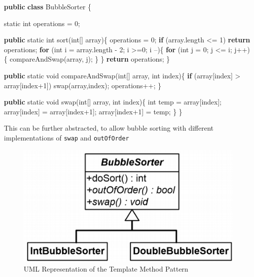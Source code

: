 \documentclass[]{article}
\newenvironment{Shaded}{}{}
\newcommand{\DataTypeTok}[1]{\textcolor[rgb]{0.56,0.13,0.00}{#1}}
\newcommand{\DecValTok}[1]{\textcolor[rgb]{0.25,0.63,0.44}{#1}}
\newcommand{\FunctionTok}[1]{\textcolor[rgb]{0.02,0.16,0.49}{#1}}
\newcommand{\KeywordTok}[1]{\textcolor[rgb]{0.00,0.44,0.13}{\textbf{#1}}}
\newcommand{\NormalTok}[1]{#1}
\begin{document}
\begin{Shaded}
\begin{Highlighting}[]
\KeywordTok{public} \KeywordTok{class}\NormalTok{ BubbleSorter \{}
    
    \DataTypeTok{static} \DataTypeTok{int}\NormalTok{ operations = }\DecValTok{0}\NormalTok{;}
    
    \KeywordTok{public} \DataTypeTok{static} \DataTypeTok{int} \FunctionTok{sort}\NormalTok{(}\DataTypeTok{int}\NormalTok{[] array)\{}
\NormalTok{        operations = }\DecValTok{0}\NormalTok{;}
        \KeywordTok{if}\NormalTok{ (array.}\FunctionTok{length}\NormalTok{ <= }\DecValTok{1}\NormalTok{)}
            \KeywordTok{return}\NormalTok{ operations;}
        \KeywordTok{for}\NormalTok{ (}\DataTypeTok{int}\NormalTok{ i = array.}\FunctionTok{length}\NormalTok{ - }\DecValTok{2}\NormalTok{; i >=}\DecValTok{0}\NormalTok{; i --)\{}
            \KeywordTok{for}\NormalTok{ (}\DataTypeTok{int}\NormalTok{ j = }\DecValTok{0}\NormalTok{; j <= i; j++)\{}
                \FunctionTok{compareAndSwap}\NormalTok{(array, j);}
\NormalTok{            \}}
\NormalTok{        \}}
        \KeywordTok{return}\NormalTok{ operations;}
\NormalTok{    \}}
    
    \KeywordTok{public} \DataTypeTok{static} \DataTypeTok{void} \FunctionTok{compareAndSwap}\NormalTok{(}\DataTypeTok{int}\NormalTok{[] array, }\DataTypeTok{int}\NormalTok{ index)\{}
        \KeywordTok{if}\NormalTok{ (array[index] > array[index+}\DecValTok{1}\NormalTok{])}
            \FunctionTok{swap}\NormalTok{(array,index);}
\NormalTok{        operations++;}
\NormalTok{    \}}
    
    \KeywordTok{public} \DataTypeTok{static} \DataTypeTok{void} \FunctionTok{swap}\NormalTok{(}\DataTypeTok{int}\NormalTok{[] array, }\DataTypeTok{int}\NormalTok{ index)\{}
        \DataTypeTok{int}\NormalTok{ temp = array[index];}
\NormalTok{        array[index] = array[index+}\DecValTok{1}\NormalTok{];}
\NormalTok{        array[index+}\DecValTok{1}\NormalTok{] = temp;}
\NormalTok{    \}}
\NormalTok{\}}
\end{Highlighting}
\end{Shaded}

This can be further abstracted, to allow bubble sorting with different
implementations of \texttt{swap} and \texttt{outOfOrder}

\begin{figure}
\centering
\includegraphics{images/templatebubble.png}
\caption{UML Representation of the Template Method Pattern}
\end{figure}
\end{document}
